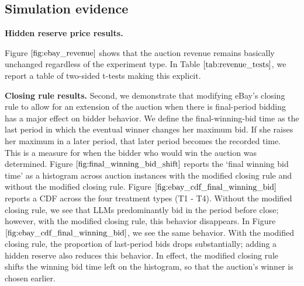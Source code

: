 \documentclass{article} %
\newcommand{\kibitz}[2]{\ifnum\Comments=1{\color{#1}{#2}}\fi}
\newcommand{\dcp}[1]{\kibitz{teal}{[DCP: #1]}}
\begin{document}
\subsection{Simulation evidence}
\textbf{Hidden reserve price results.}

Figure $\ref{fig:ebay_revenue}$  shows that the auction revenue remains basically unchanged regardless of the experiment type. In Table $\ref{tab:revenue_tests}$, we report a table of two-sided t-tests making this explicit.  
%

\noindent\textbf{Closing rule results.}
Second, we demonstrate that modifying eBay's closing rule to allow for an  extension of the auction when there is final-period bidding  
has a major effect on bidder behavior. 
We define the final-winning-bid time as the last period in which the eventual winner changes her maximum bid. If she raises her maximum in a later period, that later period becomes the recorded time.
%
This is a measure for when the bidder who would win the auction was determined.
%
Figure $\ref{fig:final_winning_bid_shift}$ reports the `final winning bid time' as a histogram across auction instances with the modified closing rule and without the modified closing rule. Figure $\ref{fig:ebay_cdf_final_winning_bid}$ reports a CDF across the four treatment types (T1 - T4). 
Without the modified closing rule, we see that LLMs predominantly bid in the period before close; however, with the modified closing rule, this behavior disappears. 
In Figure~$\ref{fig:ebay_cdf_final_winning_bid}$, we see the same behavior. 
With the modified closing rule, the proportion of last-period bids drops substantially; adding a hidden reserve also reduces this behavior. 
In effect, the modified closing rule shifts the winning bid time left on the histogram, so that the auction's winner is  chosen earlier. 
%
\end{document}
